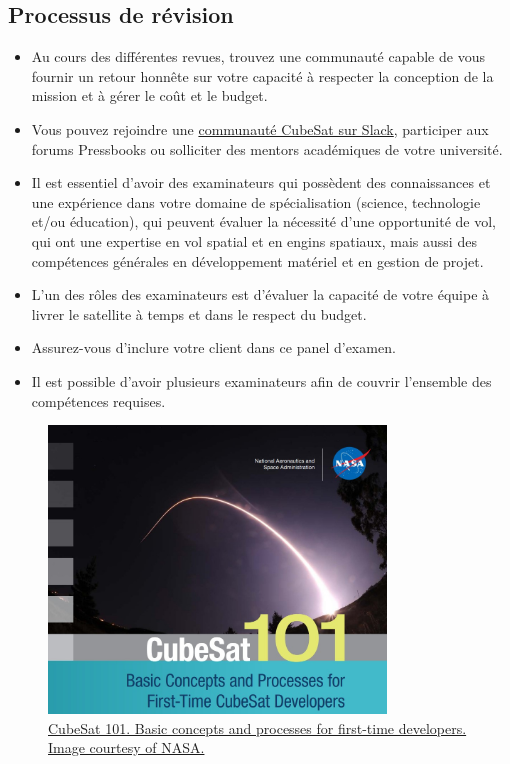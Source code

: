\subsection{Processus de révision}
\begin{itemize}
    \item Au cours des différentes revues, trouvez une communauté capable de vous fournir un retour honnête sur votre capacité à respecter la conception de la mission et à gérer le coût et le budget.  
    \item Vous pouvez rejoindre une \href{http://cubesatquestions.slack.com/}{communauté CubeSat sur Slack}, participer aux forums Pressbooks ou solliciter des mentors académiques de votre université.  
    \item Il est essentiel d’avoir des examinateurs qui possèdent des connaissances et une expérience dans votre domaine de spécialisation (science, technologie et/ou éducation), qui peuvent évaluer la nécessité d’une opportunité de vol, qui ont une expertise en vol spatial et en engins spatiaux, mais aussi des compétences générales en développement matériel et en gestion de projet.  
    \item L’un des rôles des examinateurs est d’évaluer la capacité de votre équipe à livrer le satellite à temps et dans le respect du budget.  
    \item Assurez-vous d’inclure votre client dans ce panel d’examen.  
    \item Il est possible d’avoir plusieurs examinateurs afin de couvrir l’ensemble des compétences requises.  
\end{itemize}
\begin{figure}[H] %
    \centering
    \includegraphics[width=0.8\textwidth]{figures/3.5.jpg}
    \caption{\href{https://www.nasa.gov/wp-content/uploads/2017/03/nasa_csli_cubesat_101_508.pdf}{CubeSat 101. Basic concepts and processes for first-time developers. Image courtesy of NASA.}}
    \label{fig:communication2}
\end{figure}
